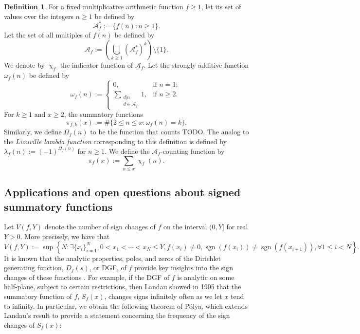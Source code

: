 \documentclass[11pt,reqno,a4letter]{article}
\numberwithin{figure}{section}
\numberwithin{table}{section}
\renewcommand{\chi}{\upchi}
\theoremstyle{plain}
\numberwithin{theorem}{section}
\theoremstyle{definition}
\newtheorem{definition}[theorem]{Definition}
\begin{document}
\begin{definition}
For a fixed multiplicative arithmetic function $f \geq 1$, let its set of values over the 
integers $n \geq 1$ be defined by 
\[
\mathcal{A}_f^{\ast} := \{f(n): n \geq 1\}.
\]
Let the set of all multiples of $f(n)$ be defined by 
\[
\mathcal{A}_f := \left(\bigcup_{k \geq 1} (\mathcal{A}_f^{\ast})^k\right) \setminus \{1\}. 
\]
We denote by $\chi_f$ the indicator function of $\mathcal{A}_f$. 
Let the strongly additive function $\omega_f(n)$ be defined by 
\[
\omega_f(n) := \begin{cases}
     0, & \text{if $n = 1$; } \\ 
     \sum\limits_{\substack{d|n \\ d \in \mathcal{A}_f}} 1, & \text{if $n \geq 2$.}
     \end{cases} 
\]
For $k \geq 1$ and $x \geq 2$, the summatory functions 
\[
\pi_{f,k}(x) := \#\{2 \leq n \leq x: \omega_f(n) = k\}.
\]
Similarly, we define $\Omega_f(n)$ to be the function that counts TODO. 
The analog to the \emph{Liouville lambda function} corresponding to this 
definition is defined by $\lambda_f(n) := (-1)^{\Omega_f(n)}$ for 
$n \geq 1$. 
We define the $\mathcal{A}_f$-counting function by 
\[
\pi_f(x) := \sum_{n \leq x} \chi_f(n). 
\]
\end{definition}

\subsection{Applications and open questions about signed summatory functions} 

Let $V(f, Y)$ denote the number of sign changes of $f$ on the interval $(0, Y]$ for 
real $Y > 0$. 
More precisely, we have that 
\[
V(f, Y) := \sup \left\{N: \exists \{x_i\}_{i=1}^N, 0<x_1<\cdots<x_N \leq Y, 
     f(x_i) \neq 0, \operatorname{sgn}(f(x_i)) \neq \operatorname{sgn}(f(x_{i+1})), 
     \forall 1 \leq i < N\right\}. 
\]
It is known that the analytic properties, poles, and zeros of the 
Dirichlet generating function, $D_f(s)$, or DGF, of $f$ provide key insights into the 
sign changes of these functions \cite{OSCPROPS-ARITHFUNCSI}. 
For example, if the DGF of $f$ is analytic on some half-plane, subject to certain 
restrictions, then Landau showed in 1905 that 
the summatory function of $f$, $S_f(x)$, changes signs infinitely often as we let 
$x$ tend to infinity. In particular, we 
obtain the following theorem of P\'olya, which extends Landau's result to provide a 
statement concerning the frequency of the sign changes of $S_f(x)$: 
\end{document}
